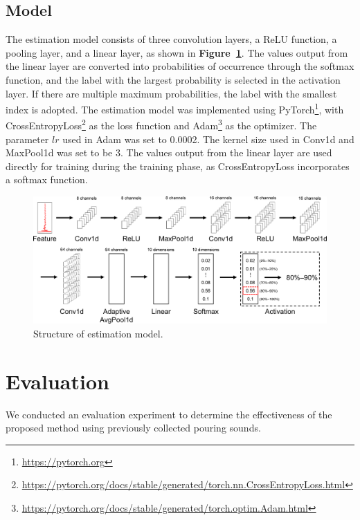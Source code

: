 \documentclass[sigconf]{acmart}
\newcommand\figref[1]{\textbf{Figure~\ref{fig:#1}}}
\begin{document}
\subsection{Model}
The estimation model consists of three convolution layers, a ReLU function, a pooling layer, and a linear layer, as shown in \figref{model}. The values output from the linear layer are converted into probabilities of occurrence through the softmax function, and the label with the largest probability is selected in the activation layer. If there are multiple maximum probabilities, the label with the smallest index is adopted. The estimation model was implemented using PyTorch\footnote{\url{https://pytorch.org}}, with CrossEntropyLoss\footnote{\url{https://pytorch.org/docs/stable/generated/torch.nn.CrossEntropyLoss.html}} as the loss function and Adam\footnote{\url{https://pytorch.org/docs/stable/generated/torch.optim.Adam.html}} as the optimizer. The parameter $lr$ used in Adam was set to 0.0002. The kernel size used in Conv1d and MaxPool1d was set to be 3. The values output from the linear layer are used directly for training during the training phase, as CrossEntropyLoss incorporates a softmax function.

\begin{figure}[!t]
  \centering
  \includegraphics[width=0.8\linewidth]{figures/model.eps}
  \caption{Structure of estimation model.}
  \label{fig:model}
\end{figure}



\section{Evaluation}
\label{sec:evaluation}
We conducted an evaluation experiment to determine the effectiveness of the proposed method using previously collected pouring sounds.

\end{document}
